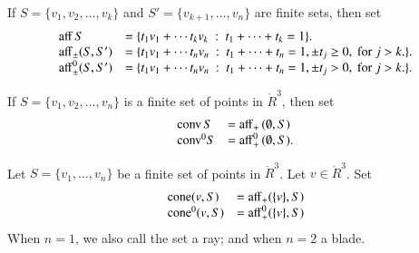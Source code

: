 \begin{tarskidata}
\begin{tarski}

\begin{definition}
If $S = \{v_1,v_2,\ldots,v_k\}$ 
and $S'=\{v_{k+1},\ldots,v_n\}$ are  finite sets, then
set
	$$\begin{array}{lll}
      {\operatorname{aff}}\, S &= \{t_1 v_1 +\cdots t_k v_k \ :\ 
	t_1 +\cdots+t_k = 1\}.\\
        {\operatorname{aff}}_{\pm} (S,S') &= \{t_1 v_1 +\cdots t_n v_n \ :\ 
	t_1 +\cdots+t_n = 1, \pm t_j \ge 0, \text{ for } j>k.\}.\\
        {\operatorname{aff}}^0_{\pm} (S,S') &= \{t_1 v_1 +\cdots t_n v_n \ :\ 
	t_1 +\cdots+t_n = 1, \pm t_j > 0, \text{ for } j>k.\}.\\
		\end{array}
        $$
\end{definition}
\end{tarski}

\begin{tarski}

\begin{definition}
If $S = \{v_1,v_2,\ldots,v_n\}$ is a finite set
of points in $\ring{R}^3$, then
set
	$$
        \begin{array}{lll}
          {\operatorname{conv}}\, S &= {\operatorname{aff}}_+\, (\emptyset,S)\\
	   {\operatorname{conv}}^0 S &= {\operatorname{aff}}^0_+\, (\emptyset,S).\\
           \end{array}
        $$
\end{definition}
\end{tarski}


\begin{tarski}

\begin{definition}[cone]
Let $S=\{v_1,\ldots,v_n\}$ be a finite set of points in 
$\ring{R}^3$.  Let $v\in\ring{R}^3$. Set
  $$\begin{array}{lll}
  {\operatorname{cone}}(v,S) &= {\operatorname{aff}}_+(\{v\},S)\\
  {\operatorname{cone}}^0(v,S) &= {\operatorname{aff}}^0_+(\{v\},S)\\
  \end{array}
  $$
When $n=1$, we also call the set a ray; and when $n=2$ a blade.
\end{definition}
\end{tarski}


\end{tarskidata}

